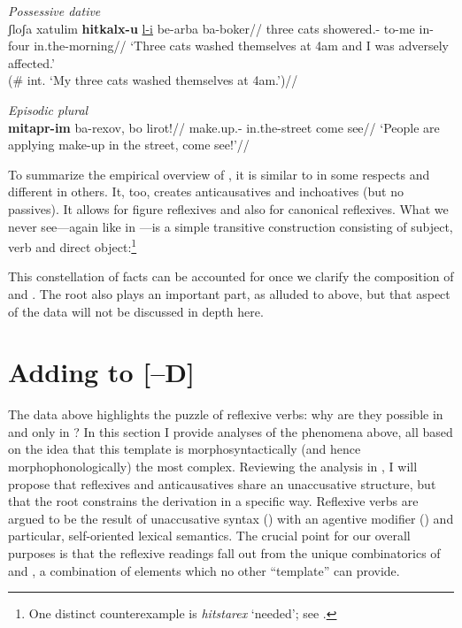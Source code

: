 \ex \textit{Possessive dative}\\
	\begingl 
	\gla \ljudge{\#}ʃloʃa xatulim \textbf{hitkalx-u} \underline{l-i} be-arba ba-boker//
	\glb three cats showered.- to-me in-four in.the-morning//
	\glft `Three cats washed themselves at 4am and I was adversely affected.'\\
		(\# int. `My three cats washed themselves at 4am.')//
	\endgl
\xe

\ex \emph{Episodic plural}\\
	\begingl
	\gla \textbf{mitapr-im} ba-rexov, bo lirot!//
	\glb make.up.- in.the-street come see//
	\glft `People are applying make-up in the street, come see!'//
	\endgl
\xe

To summarize the empirical overview of {\thit}, it is similar to {\tnif} in some respects and different in others. It, too, creates anticausatives and inchoatives (but no passives). It allows for figure reflexives and also for canonical reflexives. What we never see---again like in {\tnif}---is a simple transitive construction consisting of subject, verb and direct object:\footnote{One distinct counterexample is \emph{hitstarex} `needed'; see \citet[130ff16]{harveskayne12}.}


This constellation of facts can be accounted for once we clarify the composition of {\va} and {\vz}. The root also plays an important part, as alluded to above, but that aspect of the data will not be discussed in depth here.


\section{Adding {\va} to [--D]} \label{vz:va}
The data above highlights the puzzle of reflexive verbs: why are they possible in {\thit} and only in {\thit}? In this section I provide analyses of the phenomena above, all based on the idea that this template is morphosyntactically (and hence morphophonologically) the most complex. Reviewing the analysis in \cite{kastner17gjgl}, I will propose that reflexives and anticausatives share an unaccusative structure, but that the root constrains the derivation in a specific way. Reflexive verbs are argued to be the result of unaccusative syntax (\vz) with an agentive modifier (\va) and particular, self-oriented lexical semantics. The crucial point for our overall purposes is that the reflexive readings fall out from the unique combinatorics of {\vz} and {\va}, a combination of elements which no other ``template'' can provide.

